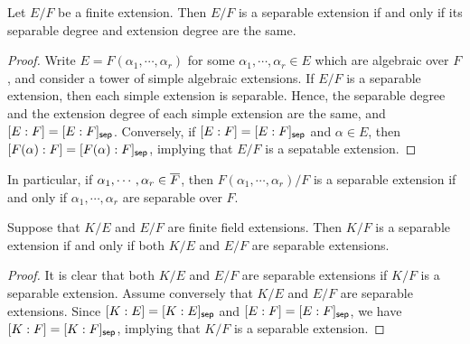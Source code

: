 \begin{prop}
    Let $E/F$ be a finite extension.
    Then $E/F$ is a separable extension if and only if its separable degree and extension degree are the same.
\end{prop}
\begin{proof}
    Write $E=F(\alpha_1, \cdots, \alpha_r)$ for some $\alpha_1, \cdots, \alpha_r\in E$ which are algebraic over $F$, and consider a tower of simple algebraic extensions.
    If $E/F$ is a separable extension, then each simple extension is separable.
    Hence, the separable degree and the extension degree of each simple extension are the same, and $[E:F]=[E:F]_{\textsf{sep}}$.
    Conversely, if $[E:F]=[E:F]_{\textsf{sep}}$ and $\alpha\in E$, then $[F(\alpha):F]=[F(\alpha): F]_{\textsf{sep}}$, implying that $E/F$ is a sepatable extension.
\end{proof}
\begin{rmk}
    In particular, if $\alpha_1, \cdots, \alpha_r\in\overline{F}$, then $F(\alpha_1, \cdots, \alpha_r)/F$ is a separable extension if and only if $\alpha_1, \cdots, \alpha_r$ are separable over $F$.
\end{rmk}

\begin{cor}\label{separability equivalence}
    Suppose that $K/E$ and $E/F$ are finite field extensions.
    Then $K/F$ is a separable extension if and only if both $K/E$ and $E/F$ are separable extensions.
\end{cor}
\begin{proof}
    It is clear that both $K/E$ and $E/F$ are separable extensions if $K/F$ is a separable extension.
    Assume conversely that $K/E$ and $E/F$ are separable extensions.
    Since $[K:E]=[K:E]_{\textsf{sep}}$ and $[E:F]=[E:F]_{\textsf{sep}}$, we have $[K:F]=[K:F]_{\textsf{sep}}$, implying that $K/F$ is a separable extension.    
\end{proof}

